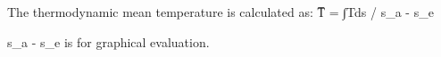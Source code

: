 The thermodynamic mean temperature is calculated as:  
T̅ = ∫Tds / s_a - s_e  

s_a - s_e is for graphical evaluation.